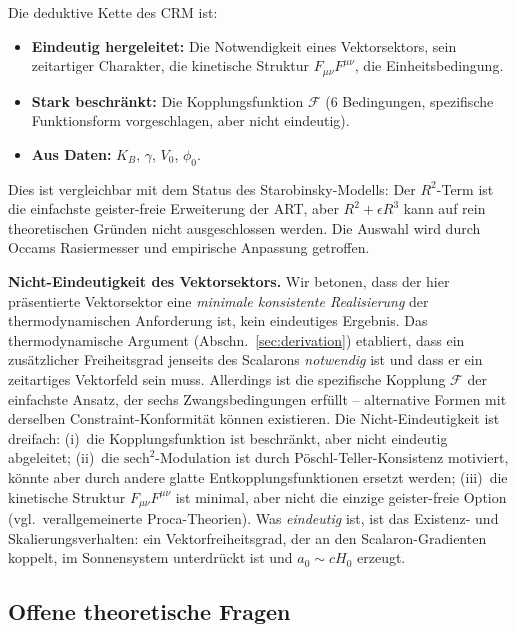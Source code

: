\documentclass[aps,prd,twocolumn,superscriptaddress,nofootinbib]{revtex4-2}
\begin{document}
Die deduktive Kette des CRM ist:
\begin{itemize}
\item \textbf{Eindeutig hergeleitet:} Die Notwendigkeit eines Vektorsektors, sein zeitartiger Charakter, die kinetische Struktur $F_{\mu\nu}F^{\mu\nu}$, die Einheitsbedingung.
\item \textbf{Stark beschr\"ankt:} Die Kopplungsfunktion $\mathcal{F}$ (6 Bedingungen, spezifische Funktionsform vorgeschlagen, aber nicht eindeutig).
\item \textbf{Aus Daten:} $K_B$, $\gamma$, $V_0$, $\phi_0$.
\end{itemize}

Dies ist vergleichbar mit dem Status des Starobinsky-Modells: Der $R^2$-Term ist die einfachste geister-freie Erweiterung der ART, aber $R^2 + \epsilon R^3$ kann auf rein theoretischen Gr\"unden nicht ausgeschlossen werden. Die Auswahl wird durch Occams Rasiermesser und empirische Anpassung getroffen.

\textbf{Nicht-Eindeutigkeit des Vektorsektors.} Wir betonen, dass der hier pr\"asentierte Vektorsektor eine \emph{minimale konsistente Realisierung} der thermodynamischen Anforderung ist, kein eindeutiges Ergebnis. Das thermodynamische Argument (Abschn.~\ref{sec:derivation}) etabliert, dass ein zus\"atzlicher Freiheitsgrad jenseits des Scalarons \emph{notwendig} ist und dass er ein zeitartiges Vektorfeld sein muss. Allerdings ist die spezifische Kopplung $\mathcal{F}$ der einfachste Ansatz, der sechs Zwangsbedingungen erf\"ullt -- alternative Formen mit derselben Constraint-Konformit\"at k\"onnen existieren. Die Nicht-Eindeutigkeit ist dreifach: (i)~die Kopplungsfunktion ist beschr\"ankt, aber nicht eindeutig abgeleitet; (ii)~die $\mathrm{sech}^2$-Modulation ist durch P\"oschl-Teller-Konsistenz motiviert, k\"onnte aber durch andere glatte Entkopplungsfunktionen ersetzt werden; (iii)~die kinetische Struktur $F_{\mu\nu}F^{\mu\nu}$ ist minimal, aber nicht die einzige geister-freie Option (vgl.\ verallgemeinerte Proca-Theorien). Was \emph{eindeutig} ist, ist das Existenz- und Skalierungsverhalten: ein Vektorfreiheitsgrad, der an den Scalaron-Gradienten koppelt, im Sonnensystem unterdr\"uckt ist und $a_0 \sim cH_0$ erzeugt.

\subsection{Offene theoretische Fragen}
\end{document}
